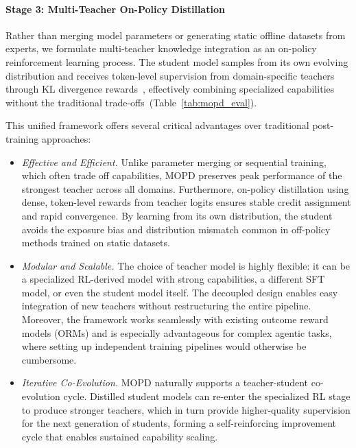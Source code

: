 \paragraph{Stage 3: Multi-Teacher On-Policy Distillation} Rather than merging model parameters or generating static offline datasets from experts, we formulate multi-teacher knowledge integration as an on-policy reinforcement learning process. The student model samples from its own evolving distribution and receives token-level supervision from domain-specific teachers through KL divergence rewards~\citep{minillm,Agarwal2023OnPolicyDO,lu2025onpolicydistillation}, effectively combining specialized capabilities without the traditional trade-offs~(Table~\ref{tab:mopd_eval}).




This unified framework offers several critical advantages over traditional post-training approaches:


\begin{itemize}
    \item \textit{Effective and Efficient.} 
    Unlike parameter merging or sequential training, which often trade off capabilities, MOPD preserves peak performance of the strongest teacher across all domains. Furthermore, on-policy distillation using dense, token-level rewards from teacher logits ensures stable credit assignment and rapid convergence. By learning from its own distribution, the student avoids the exposure bias and distribution mismatch common in off-policy methods trained on static datasets.
    \item \textit{Modular and Scalable.} The choice of teacher model is highly flexible: it can be a specialized RL-derived model with strong capabilities, a different SFT model, or even the student model itself. The decoupled design enables easy integration of new teachers without restructuring the entire pipeline. Moreover, the framework works seamlessly with existing outcome reward models (ORMs) and is especially advantageous for complex agentic tasks, where setting up independent training pipelines would otherwise be cumbersome.
    \item \textit{Iterative Co-Evolution.} MOPD naturally supports a teacher-student co-evolution cycle. Distilled student models can re-enter the specialized RL stage to produce stronger teachers, which in turn provide higher-quality supervision for the next generation of students, forming a self-reinforcing improvement cycle that enables sustained capability scaling.
\end{itemize}




